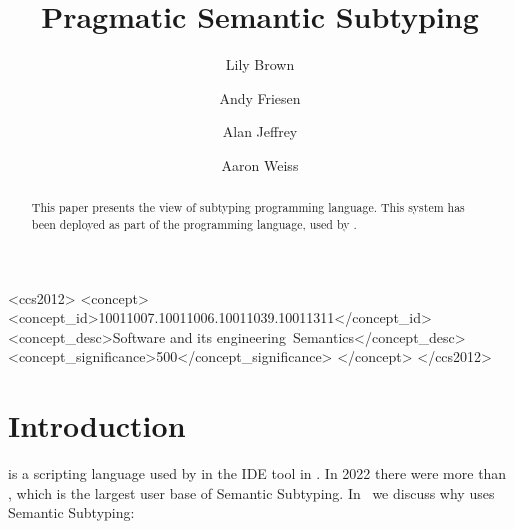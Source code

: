 \documentclass[acmsmall,review,screen]{acmart}
\begin{document}
\title{Pragmatic Semantic Subtyping}

\author{Lily Brown}
\author{Andy Friesen}
\author{Alan Jeffrey}
\author{Aaron Weiss}

\begin{abstract}
  This paper presents the view of subtyping
   programming language.
  This system has
  been deployed as part of the  programming language, used
  by .
\end{abstract}

\begin{CCSXML}
<ccs2012>
<concept>
<concept_id>10011007.10011006.10011039.10011311</concept_id>
<concept_desc>Software and its engineering~Semantics</concept_desc>
<concept_significance>500</concept_significance>
</concept>
</ccs2012>
\end{CCSXML}

\maketitle

\section{Introduction}

 is a scripting language used by  in
the IDE tool in . In 2022 there were more than
,
which is the largest user base of Semantic Subtyping.
In~ we discuss why 
uses Semantic Subtyping:

\begin{figure}
  
  \caption{}
  \label{fig:creators}

\end{figure}
\end{document}
